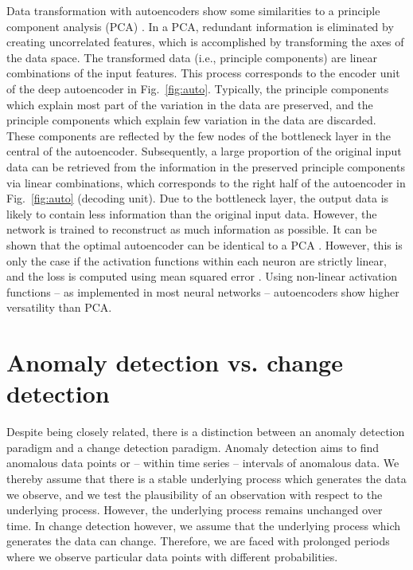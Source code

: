 \documentclass[conference]{IEEEtran}
\begin{document}
Data transformation with autoencoders show some similarities to a principle component analysis (PCA) \cite{abdi2010principal}. In a PCA, redundant information is eliminated by creating uncorrelated features, which is accomplished by transforming the axes of the data space. The transformed data (i.e., principle components) are linear combinations of the input features. This process corresponds to the encoder unit of the deep autoencoder in Fig.~\ref{fig:auto}. Typically, the principle components which explain most part of the variation in the data are preserved, and the principle components which explain few variation in the data are discarded. These components are reflected by the few nodes of the bottleneck layer in the central of the autoencoder. Subsequently, a large proportion of the original input data can be retrieved from the information in the preserved principle components via linear combinations, which corresponds to the right half of the autoencoder in Fig.~\ref{fig:auto} (decoding unit). Due to the bottleneck layer, the output data is likely to contain less information than the original input data. However, the network is trained to reconstruct as much information as possible. It can be shown that the optimal autoencoder can be identical to a PCA \cite{geron2019hands}. However, this is only the case if the activation functions within each neuron are strictly linear, and the loss is computed using mean squared error \cite{geron2019hands}. Using non-linear activation functions -- as implemented in most neural networks \cite{rashid2016make} -- autoencoders show higher versatility than PCA.

\section{Anomaly detection vs. change detection}

Despite being closely related, there is a distinction between an anomaly detection paradigm and a change detection paradigm. Anomaly detection aims to find anomalous data points or -- within time series -- intervals of anomalous data. We thereby assume that there is a stable underlying process which generates the data we observe, and we test the plausibility of an observation with respect to the underlying process. However, the underlying process remains unchanged over time. In change detection however, we assume that the underlying process which generates the data can change. Therefore, we are faced with prolonged periods where we observe particular data points with different probabilities.
\end{document}
